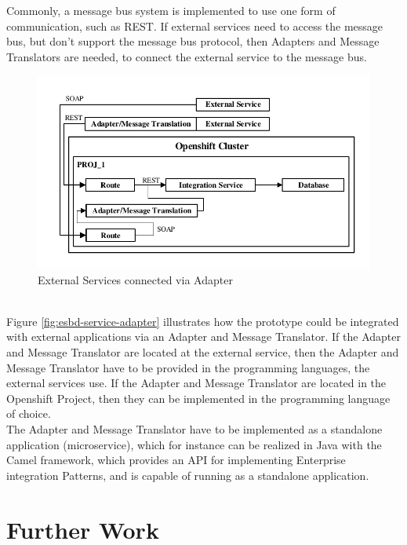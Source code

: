 Commonly, a message bus system is implemented to use one form of communication, such as REST. If external services need to access the message bus, but don't support the message bus protocol, then Adapters and Message Translators are needed, to connect the external service to the message bus. 

\begin{figure}[htbp]
	\centering
	\includegraphics[scale=1]{images/esbd-service-adapter.pdf}
	\caption{External Services connected via Adapter}
	\label{fig:esbd-service-adapter}
\end{figure}
\ \\
Figure \vref{fig:esbd-service-adapter} illustrates how the prototype could be integrated with external applications via an Adapter and Message Translator. If the Adapter and Message Translator are located at the external service, then the Adapter and Message Translator have to be provided in the programming languages, the external services use. If the Adapter and Message Translator are located in the Openshift Project, then they can be implemented in the programming language of choice. \\

The Adapter and Message Translator have to be implemented as a standalone application (microservice), which for instance can be realized in Java with the Camel framework, which provides an API for implementing Enterprise integration Patterns, and is capable of running as a standalone application. \\



\section{Further Work}
\label{sec:esbd-furhter-work}